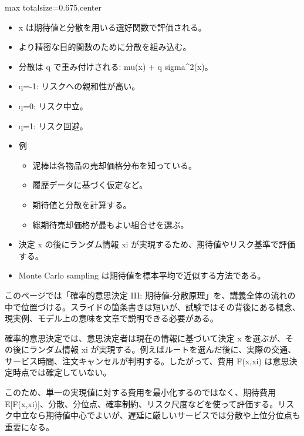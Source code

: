 \clearpage
{}
\begin{adjustbox}{max totalsize={\textwidth}{0.675\textheight},center}
\begin{minipage}{\textwidth}\scriptsize
\begin{minipage}[t]{0.485\textwidth}
\begin{itemize}
\item x は期待値と分散を用いる選好関数で評価される。
\item より精密な目的関数のために分散を組み込む。
\item 分散は q で重み付けされる: mu(x) + q sigma\textasciicircum{}2(x)。
\item q=-1: リスクへの親和性が高い。
\item q=0: リスク中立。
\item q=1: リスク回避。
\item 例
\begin{itemize}
\item 泥棒は各物品の売却価格分布を知っている。
\item 履歴データに基づく仮定など。
\item 期待値と分散を計算する。
\item 総期待売却価格が最もよい組合せを選ぶ。
\end{itemize}
\end{itemize}
\begin{itemize}
\item 決定 x の後にランダム情報 xi が実現するため、期待値やリスク基準で評価する。
\item Monte Carlo sampling は期待値を標本平均で近似する方法である。
\end{itemize}
\end{minipage}\hfill
\begin{minipage}[t]{0.485\textwidth}
このページでは「確率的意思決定 III: 期待値-分散原理」を、講義全体の流れの中で位置づける。スライドの箇条書きは短いが、試験ではその背後にある概念、現実例、モデル上の意味を文章で説明できる必要がある。\par
確率的意思決定では、意思決定者は現在の情報に基づいて決定 x を選ぶが、その後にランダム情報 xi が実現する。例えばルートを選んだ後に、実際の交通、サービス時間、注文キャンセルが判明する。したがって、費用 F(x,xi) は意思決定時点では確定していない。\par
このため、単一の実現値に対する費用を最小化するのではなく、期待費用 E[F(x,xi)]、分散、分位点、確率制約、リスク尺度などを使って評価する。リスク中立なら期待値中心でよいが、遅延に厳しいサービスでは分散や上位分位点も重要になる。\par

\end{minipage}
\end{minipage}
\end{adjustbox}
